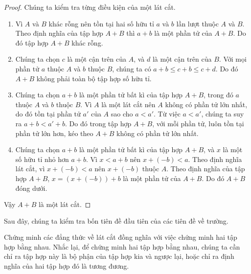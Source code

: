 \begin{proof}
    Chúng ta kiểm tra từng điều kiện của một lát cắt.
    \begin{enumerate}[label={(DC\arabic*)},itemindent=0.5cm]
        \item Vì $A$ và $B$ khác rỗng nên tồn tại hai số hữu tỉ $a$ và $b$ lần lượt thuộc $A$ và $B$. Theo định nghĩa của tập hợp $A + B$ thì $a + b$ là một phần tử của $A + B$. Do đó tập hợp $A + B$ khác rỗng.
        \item Chúng ta chọn $c$ là một cận trên của $A$, và $d$ là một cận trên của $B$. Với mọi phần tử $a$ thuộc $A$ và $b$ thuộc $B$, chúng ta có $a + b\leq c + b \leq c + d$. Do đó $A + B$ không phải toàn bộ tập hợp số hữu tỉ.
        \item Chúng ta chọn $a + b$ là một phần tử bất kì của tập hợp $A + B$, trong đó $a$ thuộc $A$ và $b$ thuộc $B$. Vì $A$ là một lát cắt nên $A$ không có phần tử lớn nhất, do đó tồn tại phần tử $a'$ của $A$ sao cho $a < a'$. Từ việc $a < a'$, chúng ta suy ra $a + b < a' + b$. Do đó trong tập hợp $A + B$, với mỗi phần tử, luôn tồn tại phần tử lớn hơn, kéo theo $A + B$ không có phần tử lớn nhất.
        \item Chúng ta chọn $a + b$ là một phần tử bất kì của tập hợp $A + B$, và $x$ là một số hữu tỉ nhỏ hơn $a + b$. Vì $x < a + b$ nên $x + (-b) < a$. Theo định nghĩa lát cắt, vì $x + (-b) < a$ nên $x + (-b)$ thuộc $A$. Theo định nghĩa của tập hợp $A + B$, $x = (x + (-b)) + b$ là một phần tử của $A + B$. Do đó $A + B$ đóng dưới.
    \end{enumerate}

    Vậy $A + B$ là một lát cắt.
\end{proof}

Sau đây, chúng ta kiểm tra bốn tiên đề đầu tiên của các tiên đề về trường.

Chứng minh các đẳng thức về lát cắt đồng nghĩa với việc chứng minh hai tập hợp bằng nhau. Nhắc lại, để chứng minh hai tập hợp bằng nhau, chúng ta cần chỉ ra tập hợp này là bộ phận của tập hợp kia và ngược lại, hoặc chỉ ra định nghĩa của hai tập hợp đó là tương đương.

